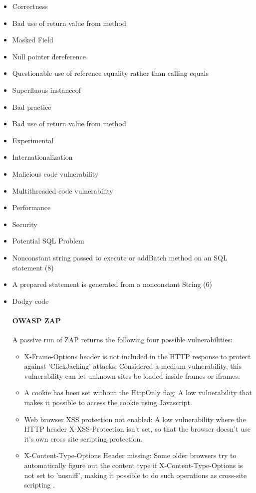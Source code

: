 \documentclass{article}
\begin{document}
\begin{itemize}
  \begin{itemize}
    \item Correctness
      \item Bad use of return value from method
      \item Masked Field
      \item Null pointer dereference
      \item Questionable use of reference equality rather than calling equals
      \item Superfluous instanceof
    \item Bad practice
      \item Bad use of return value from method
    \item Experimental
    \item Internationalization 
    \item Malicious code vulnerability
    \item Multithreaded code vulnerability
    \item Performance
    \item Security
      \item Potential SQL Problem
        \item Nonconstant string passed to execute or addBatch method on an SQL
          statement (8)
        \item A prepared statement is generated from a nonconstant String (6)
    \item Dodgy code
        
\paragraph{OWASP ZAP}

A passive run of ZAP returns the following four possible vulnerabilities:

\begin{itemize}
 \item X-Frame-Options header is not included in the HTTP response to protect against
  'ClickJacking' attacks: Considered a medium vulnerability, this
  vulnerability can let unknown sites be loaded inside frames or iframes.
 \item A cookie has been set without the HttpOnly flag: A low vulnerability that
   makes it possible to access the cookie using Javascript. 
 \item Web browser XSS protection not enabled: A low vulnerability where the
   HTTP header X-XSS-Protection isn't set, so that the browser doesn't use it's
   own cross site scripting protection.
 \item X-Content-Type-Options Header missing: Some older browsers try to
   automatically figure out the content type if X-Content-Type-Options is not
   set to 'nosniff', making it possible to do such operations as cross-site
   scripting \autocite[]{XFrameOptions}.


\end{itemize}
\end{itemize}
\end{itemize}
\end{document}
